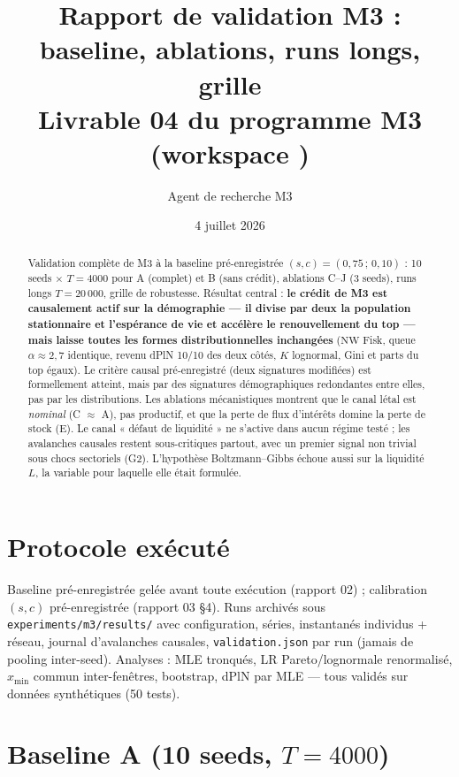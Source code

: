 \documentclass[11pt,a4paper]{article}
\title{Rapport de validation M3 : baseline, ablations, runs longs, grille\\
\large Livrable 04 du programme M3 (workspace \code{m3\_credit\_soc})}
\author{Agent de recherche M3}
\date{4 juillet 2026}
\newcommand{\NW}{\mathrm{NW}}
\newcommand{\code}[1]{\texttt{#1}}
\begin{document}
\maketitle

\begin{abstract}
Validation complète de M3 à la baseline pré-enregistrée
$(s, c) = (0{,}75\,;\,0{,}10)$ : 10 seeds $\times$ $T{=}4000$ pour A (complet)
et B (sans crédit), ablations C--J (3 seeds), runs longs $T{=}20\,000$,
grille de robustesse. Résultat central : \textbf{le crédit de M3 est
causalement actif sur la démographie — il divise par deux la population
stationnaire et l'espérance de vie et accélère le renouvellement du top —
mais laisse toutes les formes distributionnelles inchangées} ($\NW$ Fisk,
queue $\alpha \approx 2{,}7$ identique, revenu dPlN 10/10 des deux côtés,
$K$ lognormal, Gini et parts du top égaux). Le critère causal pré-enregistré
(deux signatures modifiées) est formellement atteint, mais par des
signatures démographiques redondantes entre elles, pas par les
distributions. Les ablations mécanistiques montrent que le canal létal est
\emph{nominal} (C $\approx$ A), pas productif, et que la perte de flux
d'intérêts domine la perte de stock (E). Le canal « défaut de liquidité »
ne s'active dans aucun régime testé ; les avalanches causales restent
sous-critiques partout, avec un premier signal non trivial sous chocs
sectoriels (G2). L'hypothèse Boltzmann--Gibbs échoue aussi sur la liquidité
$L$, la variable pour laquelle elle était formulée.
\end{abstract}

\section{Protocole exécuté}

Baseline pré-enregistrée gelée avant toute exécution (rapport 02) ;
calibration $(s,c)$ pré-enregistrée (rapport 03 §4). Runs archivés sous
\code{experiments/m3/results/} avec configuration, séries, instantanés
individus + réseau, journal d'avalanches causales, \code{validation.json}
par run (jamais de pooling inter-seed). Analyses : MLE tronqués, LR
Pareto/lognormale renormalisé, $x_{\min}$ commun inter-fenêtres, bootstrap,
dPlN par MLE — tous validés sur données synthétiques (50 tests).

\section{Baseline A (10 seeds, $T = 4000$)}
\end{document}

